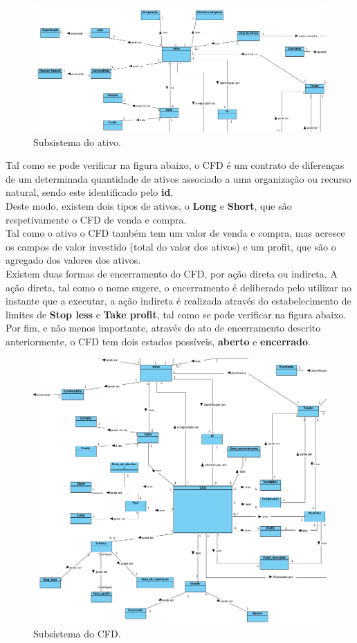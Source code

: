 \documentclass[11pt,a4paper]{report}%
\begin{document}
\begin{figure}[H]
	\centering
	\includegraphics[scale=0.6]{modelo-dominio-2.png}
	\caption{Subsistema do ativo. }
	\label{img:pag}
\end{figure}
Tal como se pode verificar na figura abaixo, o CFD é um contrato de diferenças de um determinada quantidade de ativos associado a uma organização ou recurso natural, sendo este identificado pelo \textbf{id}. \\
Deste modo, existem dois tipos de ativos, o \textbf{Long} e \textbf{Short}, que são respetivamente o CFD de venda e compra. \\Tal como o ativo o CFD também tem um valor de venda e compra, mas acresce os campos de valor investido (total do valor dos ativos) e um profit, que são o agregado dos valores dos ativos.\\Existem duas formas de encerramento do CFD, por ação direta ou indireta. A ação direta, tal como o nome sugere, o encerramento é deliberado pelo utilizar no instante que a executar, a ação indireta é realizada através do estabelecimento de limites de \textbf{Stop less} e \textbf{Take profit}, tal como se pode verificar na figura abaixo.\\ Por fim, e não menos importante, através do ato de encerramento descrito anteriormente, o CFD tem dois estados possíveis, \textbf{aberto} e \textbf{encerrado}.

\begin{figure}[H]
	\includegraphics[scale=0.6]{modelo-dominio-3.png}
	\caption{Subsistema do CFD. }
	\label{img:pag}
\end{figure}
\end{document}
